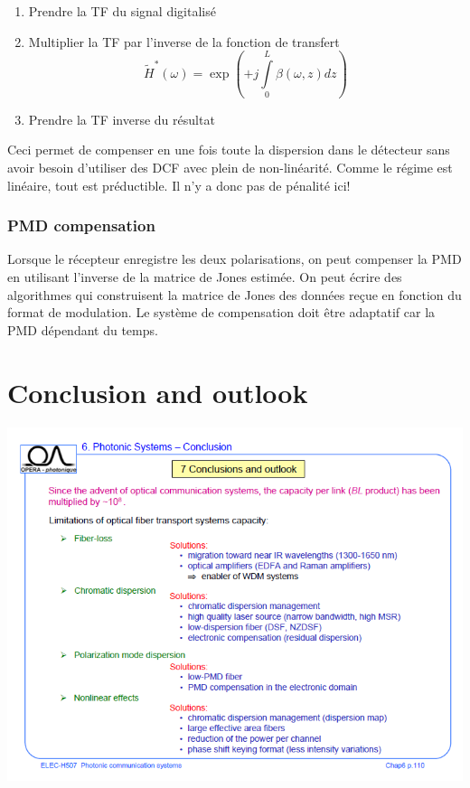 \begin{enumerate}
\item Prendre la TF du signal digitalisé
\item Multiplier la TF par l'inverse de la fonction de transfert
\begin{equation}
{\tilde H^*}(\omega ) = \exp ( + j\int\limits_0^L {\beta (\omega ,z)dz} )
\end{equation}
\item Prendre la TF inverse du résultat
\end{enumerate}

Ceci permet de compenser en une fois toute la dispersion dans le détecteur sans avoir 
besoin d'utiliser des DCF avec plein de non-linéarité. Comme le régime est linéaire, tout
est préductible. Il n'y a donc pas de pénalité ici!

\subsubsection{PMD compensation}
Lorsque le récepteur enregistre les deux polarisations, on peut compenser la PMD en utilisant
l'inverse de la matrice de Jones estimée. On peut écrire des algorithmes qui construisent la
matrice de Jones des données reçue en fonction du format de modulation. Le système de compensation
 doit être adaptatif car la PMD dépendant du temps.


\section{Conclusion and outlook}
\begin{center}
	\includegraphics[scale=0.55]{ch6/image48}
\end{center}


